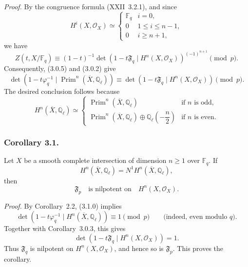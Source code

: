 \medskip
\noindent\emph{Proof.}
By the congruence formula (XXII~3.2.1), and since
\begin{equation}\tag{3.0.4}
H^i(X,\mathcal O_X)\simeq
\begin{cases}
\mathbb F_q & i=0,\\[1.5ex]
0 & 1\leq i\leq n-1,\\[1.5ex]
0 & i\geq n+1,
\end{cases}
\end{equation}
we have
\begin{equation}\tag{3.0.5}
Z(t,X/\mathbb F_q)\equiv
(1-t)^{-1}
\det\!\left(1-t\mathfrak F_q\mid H^n(X,\mathcal O_X)\right)^{(-1)^{n+1}}
\pmod p.
\end{equation}
Consequently, (3.0.5) and (3.0.2) give
\begin{equation}\tag{3.0.6}
\det\!\left(1-t\varphi_q^{-1}\mid
\operatorname{Prim}^n(\overline X,\mathbb Q_\ell)\right)
\equiv
\det\!\left(1-t\mathfrak F_q\mid H^n(X,\mathcal O_X)\right)
\pmod p.
\end{equation}
The desired conclusion follows because
\begin{equation}\tag{3.0.7}
H^n(\overline X,\mathbb Q_\ell)\simeq
\begin{cases}
\operatorname{Prim}^n(\overline X,\mathbb Q_\ell)
  & \text{if $n$ is odd},\\[2mm]
\operatorname{Prim}^n(\overline X,\mathbb Q_\ell)
 \oplus\mathbb Q_\ell\!\left(-\dfrac n2\right)
  & \text{if $n$ is even}.
\end{cases}
\end{equation}

\subsubsection*{Corollary 3.1.}
Let $X$ be a smooth complete intersection of dimension $n\geq1$ over
$\mathbb F_q$.  If
\begin{equation}\tag{3.1.0}
H^n(\overline X,\mathbb Q_\ell)=N^1H^n(\overline X,\mathbb Q_\ell),
\end{equation}
then
\begin{equation}\tag{3.1.1}
\mathfrak F_p\quad\text{is nilpotent on}\quad H^n(X,\mathcal O_X).
\end{equation}

\medskip
\noindent\emph{Proof.}
By Corollary~2.2, (3.1.0) implies
\begin{equation}\tag{3.1.2}
\det\!\left(1-t\varphi_q^{-1}\mid
H^n(\overline X,\mathbb Q_\ell)\right)
\equiv1\pmod p
\qquad\text{(indeed, even modulo $q$)}.
\end{equation}
Together with Corollary~3.0.3, this gives
\begin{equation}\tag{3.1.3}
\det\!\left(1-t\mathfrak F_q\mid H^n(X,\mathcal O_X)\right)=1.
\end{equation}
Thus $\mathfrak F_q$ is nilpotent on $H^n(X,\mathcal O_X)$, and hence so is
$\mathfrak F_p$.  This proves the corollary.

